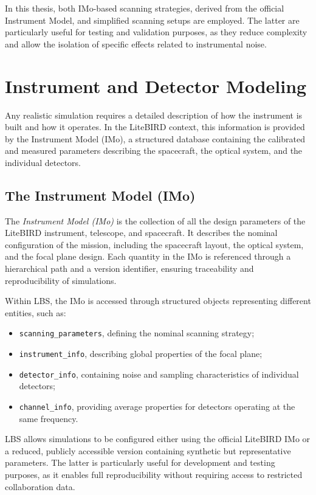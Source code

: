 In this thesis, both IMo-based scanning strategies, derived from the official Instrument Model, and simplified scanning setups are employed. The latter are particularly useful for testing and validation purposes, as they reduce complexity and allow the isolation of specific effects related to instrumental noise.


\section{Instrument and Detector Modeling}

Any realistic simulation requires a detailed description of how the instrument is built and how it operates. In the LiteBIRD context, this information is provided by the Instrument Model (IMo), a structured database containing the calibrated and measured parameters describing the spacecraft, the optical system, and the individual detectors.



\subsection{The Instrument Model (IMo)}
The \textit{Instrument Model (IMo)} is the collection of all the design parameters of the 
LiteBIRD instrument, telescope, and spacecraft. It describes the nominal configuration of the mission, including the spacecraft layout, the optical system, and the focal plane design. Each quantity in the IMo is referenced through a hierarchical path and a version identifier, ensuring traceability and 
reproducibility of simulations.

Within LBS, the IMo is accessed through structured objects representing different entities, such as:
\begin{itemize}
    \item \texttt{scanning\_parameters}, defining the nominal scanning strategy;
    \item \texttt{instrument\_info}, describing global properties of the focal plane;
    \item \texttt{detector\_info}, containing noise and sampling characteristics of individual detectors;
    \item \texttt{channel\_info}, providing average properties for detectors operating at the same frequency.
\end{itemize}

LBS allows simulations to be configured either using the official LiteBIRD IMo or a reduced, publicly accessible version containing synthetic but representative parameters. The latter is particularly useful for development and testing purposes, as it enables full reproducibility without requiring access to restricted collaboration data.



